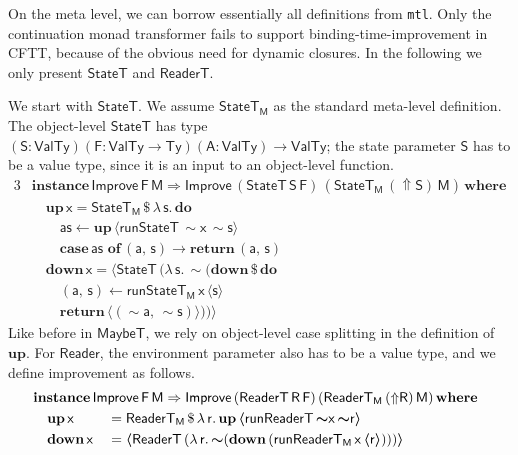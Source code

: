 \documentclass[acmsmall,screen]{acmart}
\newcommand{\mit}[1]{{\mathsf{#1}}}
\newcommand{\msf}[1]{{\mathsf{#1}}}
\newcommand{\mbf}[1]{{\mathbf{#1}}}
\newcommand{\bs}[1]{\boldsymbol{#1}}
\newcommand{\mdo}{\mbf{do}\,}
\newcommand{\ind}{\hspace{1em}}
\newcommand{\return}{\mbf{return}\,}
\newcommand{\lam}{\lambda\,}
\newcommand{\where}{\mbf{where}}
\newcommand{\M}{\msf{M}}
\newcommand{\of}{\mbf{of}\,}
\newcommand{\vA}{\mathsf{A}}
\newcommand{\vS}{\mathsf{S}}
\newcommand{\vF}{\mathsf{F}}
\newcommand{\vR}{\mathsf{R}}
\newcommand{\vM}{\mathsf{M}}
\newcommand{\va}{\mathsf{a}}
\newcommand{\vx}{\mathsf{x}}
\newcommand{\vs}{\mathsf{s}}
\newcommand{\vr}{\mathsf{r}}
\newcommand{\Reader}{\msf{Reader}}
\newcommand{\ReaderT}{\msf{ReaderT}}
\newcommand{\fro}{\leftarrow}
\newcommand{\case}{\mbf{case\,}}
\newcommand{\Up}{{\Uparrow}}
\newcommand{\spl}{{\bs{\sim}}}
\newcommand{\ql}{{\bs{\langle}}}
\newcommand{\qr}{{\bs{\rangle}}}
\newcommand{\VTy}{\msf{ValTy}}
\newcommand{\Ty}{\msf{Ty}}
\newcommand{\MaybeT}{\msf{MaybeT}}
\theoremstyle{remark}
\newcommand{\mup}{\mbf{up}}
\newcommand{\mdown}{\mbf{down}}
\newcommand{\instance}{\mbf{instance}\,}
\newcommand{\Improve}{\msf{Improve}}
\newcommand{\qt}[1]{\ql#1\qr}
\newcommand{\RA}{\Rightarrow}
\newcommand{\StateT}{\msf{StateT}}
\newcommand{\runReaderT}{\mit{runReaderT}}
\newcommand{\runStateT}{\mit{runStateT}}
\newcommand{\dlr}{\,\$\,}
\begin{document}
On the meta level, we can borrow essentially all definitions from
\texttt{mtl}. Only the continuation monad transformer fails to support
binding-time-improvement in CFTT, because of the obvious need for dynamic
closures. In the following we only present $\StateT$ and $\ReaderT$.

We start with $\StateT$. We assume $\StateT_\M$ as the standard meta-level
definition. The object-level $\StateT$ has type $(\vS : \VTy)(\vF : \VTy \to
\Ty)(\vA : \VTy) \to \VTy$; the state parameter $\vS$ has to be a value type,
since it is an input to an object-level function.
\begin{alignat*}{3}
  &\instance \Improve\,\vF\,\vM \RA \Improve\,(\StateT\,\vS\,\vF)\,(\StateT_\M\,(\Up \vS)\,\vM)\,\where\\
  &\ind \mup\,\vx = \StateT_\M \dlr \lam \vs.\,\mdo\\
  &\ind\ind \mit{as} \fro \mup\,\qt{\runStateT\,\spl \vx\,\spl \vs}\\
  &\ind\ind \case \mit{as}\,\,\of (\va,\,\vs) \to \return (\va,\,\vs)\\
  &\ind \mdown\,\vx = \qt{ \StateT\,(\lam \vs.\, \spl(\mdown \dlr \mdo\\\
  &\ind \ind (\va,\,\vs) \fro \runStateT_\M\,\vx\,\qt{\vs}\\
  &\ind \ind \return \qt{(\spl \va,\, \spl \vs)}))}
\end{alignat*}
Like before in $\MaybeT$, we rely on object-level case splitting in the
definition of $\mup$. For $\Reader$, the environment parameter also has to be a
value type, and we define improvement as follows.
\begin{alignat*}{3}
  &\hspace{-5em}\mathrlap{\instance \Improve\,\vF\,\vM \RA \Improve\,(\ReaderT\,\vR\,\vF)\,(\ReaderT_\M\,(\Up \vR)\,\vM)\,\where}\\
  &\hspace{-5em}\ind \mup\,\vx   &&= \ReaderT_\M \dlr \lam \vr.\, \mup\,\qt{\runReaderT\,\spl \vx\,\spl \vr}\\
  &\hspace{-5em}\ind \mdown\,\vx &&= \qt{\ReaderT\,(\lam \vr.\,\spl(\mdown\,(\runReaderT_\M\,\vx\,\qt{\vr})))}
\end{alignat*}
\end{document}
